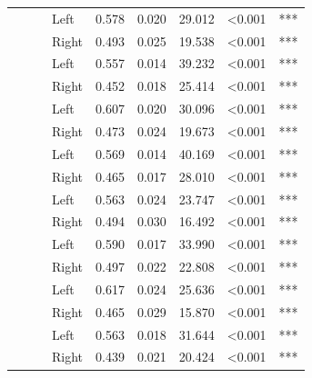 \begin{longtable}[t]{>{\raggedright\arraybackslash}t{4cm}>{\raggedright\arraybackslash}t{4cm}>{\raggedright\arraybackslash}t{2.5cm}lrrrll}
\nopagebreak
 &  &  & Left & 0.578 & 0.020 & 29.012 & <0.001 & ***\\
\nopagebreak
 &  &  & Right & 0.493 & 0.025 & 19.538 & <0.001 & ***\\
\nopagebreak
 &  &  & Left & 0.557 & 0.014 & 39.232 & <0.001 & ***\\
\nopagebreak
 &  &  & Right & 0.452 & 0.018 & 25.414 & <0.001 & ***\\
\nopagebreak
 &  &  & Left & 0.607 & 0.020 & 30.096 & <0.001 & ***\\
\nopagebreak
 &  &  & Right & 0.473 & 0.024 & 19.673 & <0.001 & ***\\
\nopagebreak
 &  &  & Left & 0.569 & 0.014 & 40.169 & <0.001 & ***\\
\nopagebreak
{} &  &  & Right & 0.465 & 0.017 & 28.010 & <0.001 & ***\\
\pagebreak[0]
 &  &  & Left & 0.563 & 0.024 & 23.747 & <0.001 & ***\\
\nopagebreak
 &  &  & Right & 0.494 & 0.030 & 16.492 & <0.001 & ***\\
\nopagebreak
 &  &  & Left & 0.590 & 0.017 & 33.990 & <0.001 & ***\\
\nopagebreak
 &  &  & Right & 0.497 & 0.022 & 22.808 & <0.001 & ***\\
\nopagebreak
 &  &  & Left & 0.617 & 0.024 & 25.636 & <0.001 & ***\\
\nopagebreak
 &  &  & Right & 0.465 & 0.029 & 15.870 & <0.001 & ***\\
\nopagebreak
 &  &  & Left & 0.563 & 0.018 & 31.644 & <0.001 & ***\\
\nopagebreak
 &  &  & Right & 0.439 & 0.021 & 20.424 & <0.001 & ***\\

\end{longtable}
